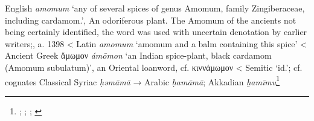 \begin{etymology}\label{ety:amomum}
English \textit{amomum} `any of several spices of genus Amomum, family Zingiberaceae, including cardamom.', An odoriferous plant. The Amomum of the ancients not being certainly identified, the word was used with uncertain denotation by earlier writers;, a. 1398
< Latin \textit{amomum} `amomum and a balm containing this spice'
< Ancient Greek {ἄμωμον} \textit{ámōmon} `an Indian spice-plant, black cardamom (Amomum subulatum)', an Oriental loanword, cf. κιννάμωμον
< Semitic `id.'; cf. cognates Classical Syriac  \textit{ḥəmāmā} → Arabic  \textit{ḥamāmā}; Akkadian \textit{ḫamīmu}\footnote{\textcite[s.v. amomum]{oed}; \textcite{lewis_latin_1879}; \textcites[]{liddell_greek-english_1940}[97]{beekes_etymological_2010}; \textcites[169]{low_aramaeische_1881}[100]{lev_practical_2008}[vol. 6, p. 66]{roth_assyrian_2004}}
\end{etymology}